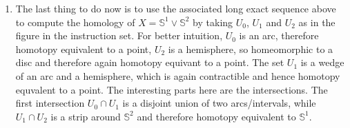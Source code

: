 \documentclass[a4paper, 12pt]{article}
\DeclareMathOperator{\im}{im}
\renewcommand{\S}{\mathbb{S}}
\newcommand{\Z}{\mathbb{Z}}
\newcommand{\iso}{\cong}
\begin{document}
\begin{enumerate}
%	
	
	 \item The last thing to do now is to use the associated long exact sequence above to compute the homology of $X = \S^1\vee\S^2$ by taking $U_0$, $U_1$ and $U_2$ as in the figure in the instruction set. For better intuition, $U_0$ is an arc, therefore homotopy equivalent to a point, $U_2$ is a hemisphere, so homeomorphic to a disc and therefore again homotopy equivant to a point. The set $U_1$ is a wedge of an arc and a hemisphere, which is again contractible and hence homotopy equvalent to a point. The interesting parts here are the intersections. The first intersection $U_0 \cap U_1$ is a disjoint union of two arcs/intervals, while $U_1 \cap U_2$ is a strip around $\S^2$ and therefore homotopy equivalent to $\S^1$.
	 

\end{enumerate}
\end{document}
